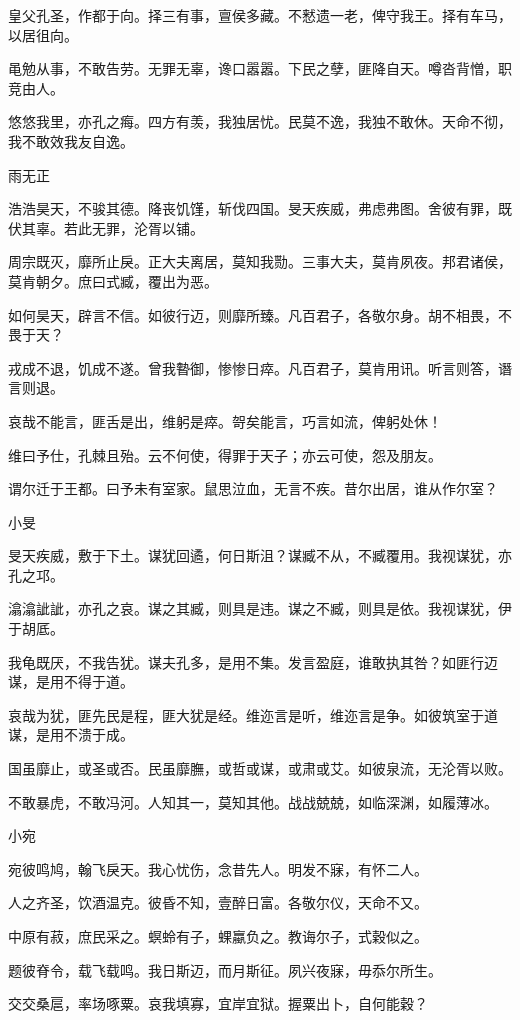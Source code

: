 皇父孔圣，作都于向。择三有事，亶侯多藏。不慭遗一老，俾守我王。择有车马，以居徂向。

黾勉从事，不敢告劳。无罪无辜，谗口嚣嚣。下民之孽，匪降自天。噂沓背憎，职竞由人。

悠悠我里，亦孔之痗。四方有羡，我独居忧。民莫不逸，我独不敢休。天命不彻，我不敢效我友自逸。

雨无正

浩浩昊天，不骏其德。降丧饥馑，斩伐四国。旻天疾威，弗虑弗图。舍彼有罪，既伏其辜。若此无罪，沦胥以铺。

周宗既灭，靡所止戾。正大夫离居，莫知我勚。三事大夫，莫肯夙夜。邦君诸侯，莫肯朝夕。庶曰式臧，覆出为恶。

如何昊天，辟言不信。如彼行迈，则靡所臻。凡百君子，各敬尔身。胡不相畏，不畏于天？

戎成不退，饥成不遂。曾我暬御，惨惨日瘁。凡百君子，莫肯用讯。听言则答，谮言则退。

哀哉不能言，匪舌是出，维躬是瘁。哿矣能言，巧言如流，俾躬处休！

维曰予仕，孔棘且殆。云不何使，得罪于天子；亦云可使，怨及朋友。

谓尔迁于王都。曰予未有室家。鼠思泣血，无言不疾。昔尔出居，谁从作尔室？

小旻

旻天疾威，敷于下土。谋犹回遹，何日斯沮？谋臧不从，不臧覆用。我视谋犹，亦孔之邛。

潝潝訿訿，亦孔之哀。谋之其臧，则具是违。谋之不臧，则具是依。我视谋犹，伊于胡厎。

我龟既厌，不我告犹。谋夫孔多，是用不集。发言盈庭，谁敢执其咎？如匪行迈谋，是用不得于道。

哀哉为犹，匪先民是程，匪大犹是经。维迩言是听，维迩言是争。如彼筑室于道谋，是用不溃于成。

国虽靡止，或圣或否。民虽靡膴，或哲或谋，或肃或艾。如彼泉流，无沦胥以败。

不敢暴虎，不敢冯河。人知其一，莫知其他。战战兢兢，如临深渊，如履薄冰。

小宛

宛彼鸣鸠，翰飞戾天。我心忧伤，念昔先人。明发不寐，有怀二人。

人之齐圣，饮酒温克。彼昏不知，壹醉日富。各敬尔仪，天命不又。

中原有菽，庶民采之。螟蛉有子，蜾蠃负之。教诲尔子，式穀似之。

题彼脊令，载飞载鸣。我日斯迈，而月斯征。夙兴夜寐，毋忝尔所生。

交交桑扈，率场啄粟。哀我填寡，宜岸宜狱。握粟出卜，自何能穀？

